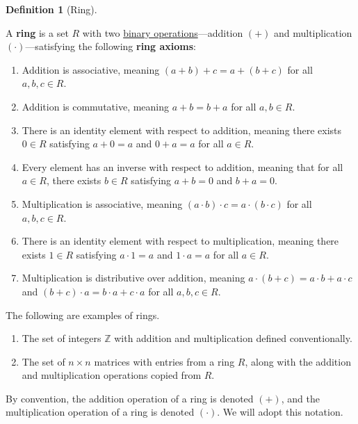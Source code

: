 \documentclass{scrartcl}
\theoremstyle{definition}
\newtheorem{definition}{Definition}[section]
\theoremstyle{plain}
\begin{document}
\begin{definition}[Ring]
    \label{def:ring}

    \newcommand{\Z}{\mathbb{Z}}

    A \textbf{ring} is a set $R$ with two \hyperref[def:binary operation]{binary operations}---addition $(+)$ and
    multiplication $(\cdot)$---satisfying the following \textbf{ring axioms}:
    \begin{enumerate}
        \item Addition is associative, meaning $(a+b)+c=a+(b+c)$ for all $a,b,c\in R$.
        \item Addition is commutative, meaning $a+b=b+a$ for all $a,b\in R$.

        \item
            There is an identity element with respect to addition, meaning there exists $0\in R$ satisfying $a+0=a$ and
            $0+a=a$ for all $a\in R$.

        \item
            Every element has an inverse with respect to addition, meaning that for all $a\in R$, there exists $b\in R$
            satisfying $a+b=0$ and $b+a=0$.

        \item Multiplication is associative, meaning $(a\cdot b)\cdot c=a\cdot (b\cdot c)$ for all $a,b,c\in R$.

        \item
            There is an identity element with respect to multiplication, meaning there exists $1\in R$ satisfying
            $a\cdot 1=a$ and $1\cdot a=a$ for all $a\in R$.

        \item
            Multiplication is distributive over addition, meaning $a\cdot (b+c)=a\cdot b+a\cdot c$ and
            $(b+c)\cdot a=b\cdot a+c\cdot a$ for all $a,b,c\in R$.
    \end{enumerate}

    The following are examples of rings.
    \begin{enumerate}
        \item The set of integers $\Z$ with addition and multiplication defined conventionally.
        \item
            The set of $n\times n$ matrices with entries from a ring $R$, along with the addition and multiplication
            operations copied from $R$.
    \end{enumerate}

    By convention, the addition operation of a ring is denoted $(+)$, and the multiplication operation of a ring is
    denoted $(\cdot)$.
    We will adopt this notation.


\end{definition}
\end{document}
